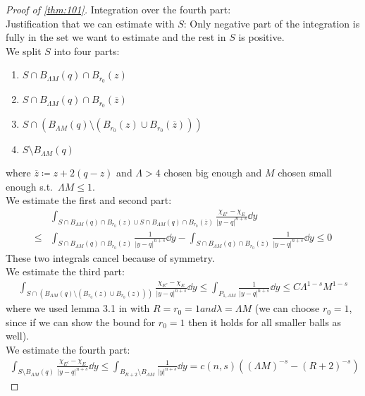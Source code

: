 \begin{proof}[Proof of \cref{thm:101}]
	Integration over the fourth part: \\
	Justification that we can estimate with \( S \): Only negative part of the integration
	is fully in the set we want to estimate and the rest in \( S \) is positive. \\
	We split \( S \) into four parts:
	\begin{enumerate}[label = \roman*)]
		\item \( S \cap B_{\Lambda M} (q) \cap B_{r_0}(z) \)
		\item \( S \cap B_{\Lambda M} (q) \cap B_{r_0}( \overline{z}) \)
		\item \( S \cap (B_{\Lambda M} (q)\setminus ( B_{r_0}(z) \cup
		      B_{r_0}(\overline{z}))) \)
		\item \( S \setminus B_{\Lambda M} (q) \)
	\end{enumerate}
	where \( \overline{z}\coloneqq z + 2(q-z) \) and \( \Lambda > 4 \) chosen big enough
	and \( M \) chosen small enough s.t.\ \( \Lambda M \leq 1 \). \\
	We estimate the first and second part:
	\begin{align*}
		     & \int_{S \cap B_{\Lambda M} (q) \cap B_{r_0}(z) \cup S \cap B_{\Lambda M} (q) \cap B_{r_0}(\overline{z})} \frac{\chi_{E^c}- \chi_E}{\lvert y-q\rvert^{n+s}} \dd{y} \\
		\leq & \int_{S \cap B_{\Lambda M} (q) \cap B_{r_0}(z)} \frac{1}{\lvert y-q\rvert^{n+s}} \dd{y} - \int_{S \cap B_{\Lambda M} (q) \cap B_{r_0}(\overline{z})} \frac{1}{\lvert y-q\rvert^{n+s}} \dd{y} \leq 0
	\end{align*}
	These two integrals cancel because of symmetry. \\
	We estimate the third part:
	\begin{gather*}
		\int_{S \cap (B_{\Lambda M} (q)\setminus ( B_{r_0}(z) \cup B_{r_0}(z)))}\frac{\chi_{E^c}- \chi_E}{\lvert y-q\rvert^{n+s}} \dd{y} \leq \int_{P_{1,\Lambda M}} \frac{1}{\lvert y-q\rvert^{n+s}} \dd{y} \leq C \Lambda^{1-s} M^{1-s}
	\end{gather*}
	where we used lemma 3.1 in \cite{Dipierro2016} with \( R = r_0 = 1 and \lambda =
	\Lambda M \) (we can choose \( r_0 = 1 \), since if we can show the bound for \( r_0 =
	1 \) then it holds for all smaller balls as well). \\
	We estimate the fourth part:
	\begin{gather*}
		\int_{S\setminus B_{\Lambda M} (q)} \frac{\chi_{E^c}- \chi_E}{\lvert y-q\rvert^{n+s}} \dd{y} \leq \int_{B_{R+2}\setminus B_{\Lambda M}} \frac{1}{\lvert y\rvert^{n+s}} \dd{y} = c(n,s)((\Lambda M)^{-s} - (R+2)^{-s})

\end{gather*}
\end{proof}
